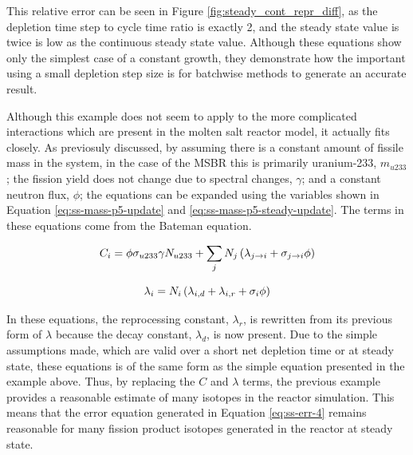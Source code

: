 This relative error can be seen in Figure \ref{fig:steady_cont_repr_diff}, as the depletion time step to cycle time ratio is exactly 2, and the steady state value is twice is low as the continuous steady state value. Although these equations show only the simplest case of a constant growth, they demonstrate how the important using a small depletion step size is for batchwise methods to generate an accurate result.

Although this example does not seem to apply to the more complicated interactions which are present in the molten salt reactor model, it actually fits closely. As previosuly discussed, by assuming there is a constant amount of fissile mass in the system, in the case of the MSBR this is primarily uranium-233, $m_{u233}$; the fission yield does not change due to spectral changes, $\gamma$; and a constant neutron flux, $\phi$; the equations can be expanded using the variables shown in Equation \eqref{eq:ss-mass-p5-update} and \eqref{eq:ss-mass-p5-steady-update}. The terms in these equations come from the Bateman equation.

\begin{equation} \hfill 
C_i = \phi \sigma_{u233} \gamma N_{u233} + \sum_j N_j \left( \lambda_{j \rightarrow i }  + \sigma_{j \rightarrow i} \phi \right)
\hfill\label{eq:ss-mass-p5-update} \end{equation}

\begin{equation} \hfill 
\lambda_i = N_i \left( \lambda_{i, d} + \lambda_{i, r} + \sigma_i \phi \right)
\hfill\label{eq:ss-mass-p5-steady-update} \end{equation}

In these equations, the reprocessing constant, $\lambda_r$, is rewritten from its previous form of $\lambda$ because the decay constant, $\lambda_d$, is now present.
Due to the simple assumptions made, which are valid over a short net depletion time or at steady state, these equations is of the same form as the simple equation presented in the example above.
Thus, by replacing the $C$ and $\lambda$ terms, the previous example provides a reasonable estimate of many isotopes in the reactor simulation.
This means that the error equation generated in Equation \eqref{eq:ss-err-4} remains reasonable for many fission product isotopes generated in the reactor at steady state. 

